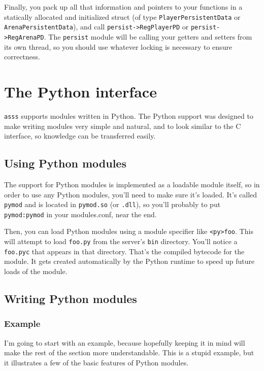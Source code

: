 \documentclass{article}
\newcommand{\asss}{\texttt{asss}}
\begin{document}
Finally, you pack up all that information and pointers to your functions
in a statically allocated and initialized struct (of type
\verb/PlayerPersistentData/ or \verb/ArenaPersistentData/), and call
\verb/persist->RegPlayerPD/ or \verb/persist->RegArenaPD/. The
\verb/persist/ module will be calling your getters and setters from its
own thread, so you should use whatever locking is necessary to ensure
correctness.


\section{The Python interface}

\asss{} supports modules written in Python. The Python support was
designed to make writing modules very simple and natural, and to look
similar to the C interface, so knowledge can be transferred easily.


\subsection{Using Python modules}

The support for Python modules is implemented as a loadable module
itself, so in order to use any Python modules, you'll need to make sure
it's loaded. It's called \verb/pymod/ and is located in \verb/pymod.so/
(or \verb/.dll/), so you'll probably to put \verb/pymod:pymod/ in your
modules.conf, near the end.

Then, you can load Python modules using a module specifier like
\verb/<py>foo/. This will attempt to load \verb/foo.py/ from the
server's \verb/bin/ directory. You'll notice a \verb/foo.pyc/ that
appears in that directory. That's the compiled bytecode for the module.
It gets created automatically by the Python runtime to speed up future
loads of the module.


\subsection{Writing Python modules}

\subsubsection{Example}

I'm going to start with an example, because hopefully keeping it in mind
will make the rest of the section more understandable. This is a stupid
example, but it illustrates a few of the basic features of Python
modules.
\end{document}
